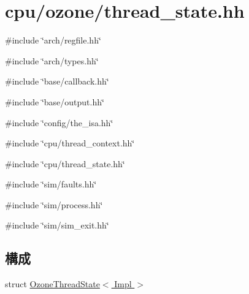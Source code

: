 \hypertarget{ozone_2thread__state_8hh}{
\section{cpu/ozone/thread\_\-state.hh}
\label{ozone_2thread__state_8hh}
}
{\ttfamily \#include \char`\"{}arch/regfile.hh\char`\"{}}\par
{\ttfamily \#include \char`\"{}arch/types.hh\char`\"{}}\par
{\ttfamily \#include \char`\"{}base/callback.hh\char`\"{}}\par
{\ttfamily \#include \char`\"{}base/output.hh\char`\"{}}\par
{\ttfamily \#include \char`\"{}config/the\_\-isa.hh\char`\"{}}\par
{\ttfamily \#include \char`\"{}cpu/thread\_\-context.hh\char`\"{}}\par
{\ttfamily \#include \char`\"{}cpu/thread\_\-state.hh\char`\"{}}\par
{\ttfamily \#include \char`\"{}sim/faults.hh\char`\"{}}\par
{\ttfamily \#include \char`\"{}sim/process.hh\char`\"{}}\par
{\ttfamily \#include \char`\"{}sim/sim\_\-exit.hh\char`\"{}}\par
\subsection*{構成}
\begin{DoxyCompactItemize}
\item 
struct \hyperlink{structOzoneThreadState}{OzoneThreadState$<$ Impl $>$}
\end{DoxyCompactItemize}
